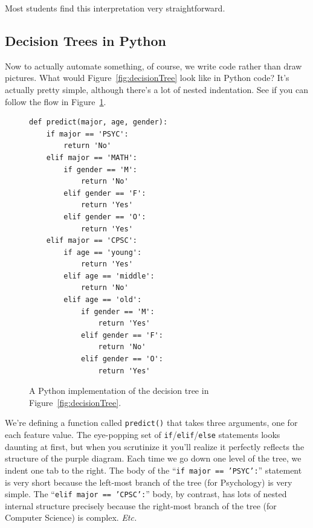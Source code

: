 Most students find this interpretation very straightforward.

\subsection{Decision Trees in Python}


Now to actually automate something, of course, we write code rather than draw
pictures. What would Figure~\ref{fig:decisionTree} look like in Python code?
It's actually pretty simple, although there's a lot of nested indentation. See
if you can follow the flow in Figure~\ref{fig:pythonDT}.

\begin{figure}[h]
\centering
\begin{Verbatim}[fontsize=\footnotesize,samepage=true,frame=single,framesep=3mm,xleftmargin=2cm,xrightmargin=2cm]
def predict(major, age, gender):
    if major == 'PSYC':
        return 'No'
    elif major == 'MATH':
        if gender == 'M':
            return 'No'
        elif gender == 'F':
            return 'Yes'
        elif gender == 'O':
            return 'Yes'
    elif major == 'CPSC':
        if age == 'young':
            return 'Yes'
        elif age == 'middle':
            return 'No'
        elif age == 'old':
            if gender == 'M':
                return 'Yes'
            elif gender == 'F':
                return 'No'
            elif gender == 'O':
                return 'Yes'
\end{Verbatim}
\caption{A Python implementation of the decision tree in
Figure~\ref{fig:decisionTree}.}
\label{fig:pythonDT}
\end{figure}


We're defining a function called \texttt{predict()} that takes three arguments,
one for each feature value. The eye-popping set of
\texttt{if}/\texttt{elif}/\texttt{else} statements looks daunting at first, but
when you scrutinize it you'll realize it perfectly reflects the structure of
the purple diagram. Each time we go down one level of the tree, we indent one
tab to the right. The body of the ``\texttt{if major == 'PSYC':}'' statement is
very short because the left-most branch of the tree (for Psychology) is very
simple. The ``\texttt{elif major == 'CPSC':}'' body, by contrast, has lots of
nested internal structure precisely because the right-most branch of the tree
(for Computer Science) is complex. \textit{Etc.}

